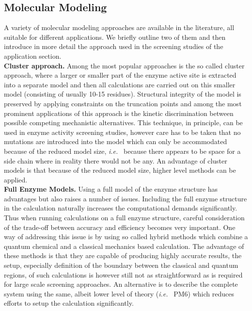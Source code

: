 \subsection{Molecular Modeling}\label{sec:modeling}
A variety of molecular modeling approaches are available in the literature, all suitable for different applications.
We briefly outline two of them and then introduce in more detail the approach used in the screening studies of the application section.\\
\textbf{Cluster approach.}
Among the most popular approaches is the so called cluster approach, where a larger or smaller part of the enzyme active site is extracted into a separate model and then all calculations are carried out on this smaller model (consisting of usually 10-15 residues\cite{lind2013quantum}).
Structural integrity of the model is preserved by applying constraints on the truncation points and among the most prominent applications of this approach is the kinetic discrimination between possible competing mechanistic alternatives\cite{noodleman2004quantum, himo2006quantum, siegbahn2009recent}.
This technique, in principle, can be used in enzyme activity screening studies, however care has to be taken that no mutations are introduced into the model which can only be accommodated because of the reduced model size, \textit{i.e. } because there appears to be space for a side chain where in reality there would not be any.
An advantage of cluster models is that because of the reduced model size, higher level methods can be applied.\\
\textbf{Full Enzyme Models.}
Using a full model of the enzyme structure has advantages but also raises a number of issues.
Including the full enzyme structure in the calculation naturally increases the computational demands significantly.
Thus when running calculations on a full enzyme structure, careful consideration of the trade-off between accuracy and efficiency becomes very important.
One way of addressing this issue is by using so called hybrid methods which combine a quantum chemical and a classical mechanics based calculation.
The advantage of these methods is that they are capable of producing highly accurate results, the setup, especially definition of the boundary between the classical and quantum regions, of such calculations is however still not as straightforward as is required for large scale screening approaches.
An alternative is to describe the complete system using the same, albeit lower level of theory (\textit{i.e. } PM6) which reduces efforts to setup the calculation significantly.
